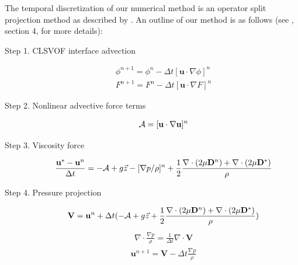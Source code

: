 \documentclass[%
 reprint,
 showkeys,
 amsmath,amssymb,
 aps,
 prfluids,
 onecolumn
]{revtex4-2}
\newcommand{\vv}{\mathbf}
\newcommand{\bmV}{\vv{V}}
\newcommand{\bmD}{\vv{D}}
\newcommand{\bmu}{\vv{u}}
\begin{document}
{\color{red}
The temporal discretization of our numerical method is an operator split
projection method as described by \cite{SUSSMAN2007469}.  An outline of 
our method is as follows (see \cite{SUSSMAN2007469}, section 4, for more 
details): }
\begin{description}
\item[Step 1. CLSVOF interface advection]
 \begin{eqnarray*}
 \phi^{n+1}=\phi^{n}-\Delta t[\bmu\cdot\nabla\phi]^{n} \\
 F^{n+1}=F^{n}-\Delta t[\bmu\cdot\nabla F]^{n} 
 \end{eqnarray*}
\item[Step 2. Nonlinear advective force terms]
 \begin{eqnarray*}
 {\cal A}=[\bmu\cdot\nabla\bmu]^{n}
 \end{eqnarray*}
\item[Step 3. Viscosity force]
 \begin{eqnarray*}
 \frac{\bmu^{\ast}-\bmu^{n}}{\Delta t}=-{\cal A}+g\vec{z}-
  [\nabla p/\rho]^{n}+\frac{1}{2}\frac{
    \nabla\cdot(2\mu\bmD^{n})+ 
    \nabla\cdot(2\mu\bmD^{\ast})}{\rho}
 \end{eqnarray*}
\item[Step 4. Pressure projection]
 \begin{eqnarray*}
 \bmV=\bmu^{n}+\Delta t(-{\cal A}+g\vec{z}+
   \frac{1}{2}\frac{
    \nabla\cdot(2\mu\bmD^{n})+ 
    \nabla\cdot(2\mu\bmD^{\ast})}{\rho})
 \end{eqnarray*}
 \begin{eqnarray*}
 \nabla\cdot\frac{\nabla p}{\rho}=\frac{1}{\Delta t}\nabla\cdot\bmV
 \end{eqnarray*}
 \begin{eqnarray*}
 \bmu^{n+1}=\bmV-\Delta t \frac{\nabla p}{\rho}
 \end{eqnarray*}
\end{description}
\end{document}
